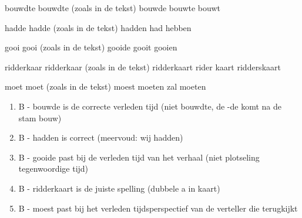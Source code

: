 \begin{opgave}
\begin{vragen}
%
{bouwdte}%
{bouwdte (zoals in de tekst)}%
{bouwde}%
{bouwte}%
{bouwt}

%
{hadde}%
{hadde (zoals in de tekst)}%
{hadden}%
{had}%
{hebben}

%
{gooi}%
{gooi (zoals in de tekst)}%
{gooide}%
{gooit}%
{gooien}

%
{ridderkaar}%
{ridderkaar (zoals in de tekst)}%
{ridderkaart}%
{rider kaart}%
{ridderskaart}

%
{moet}%
{moet (zoals in de tekst)}%
{moest}%
{moeten}%
{zal moeten}
\end{vragen}

\end{opgave}

\begin{oplossing}
\begin{enumerate}
\item B - bouwde is de correcte verleden tijd (niet bouwdte, de -de komt na
de stam bouw)
\item B - hadden is correct (meervoud: wij hadden)
\item B - gooide past bij de verleden tijd van het verhaal (niet plotseling
tegenwoordige tijd)
\item B - ridderkaart is de juiste spelling (dubbele a in kaart)
\item B - moest past bij het verleden tijdsperspectief van de verteller die
terugkijkt
\end{enumerate}
\end{oplossing}
